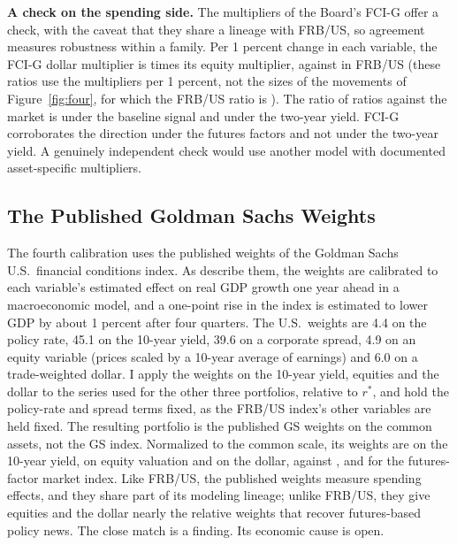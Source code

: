 \documentclass[11pt]{article}
\begin{document}
\textbf{A check on the spending side.} The multipliers of the Board's FCI-G offer a check, with the caveat that they share a lineage with FRB/US, so agreement measures robustness within a family. Per 1 percent change in each variable, the FCI-G dollar multiplier is  times its equity multiplier, against  in FRB/US (these ratios use the multipliers per 1 percent, not the sizes of the movements of Figure~\ref{fig:four}, for which the FRB/US ratio is ). The ratio of ratios against the market is  under the baseline signal and  under the two-year yield. FCI-G corroborates the direction under the futures factors and not under the two-year yield. A genuinely independent check would use another model with documented asset-specific multipliers.

\subsection{The Published Goldman Sachs Weights}\label{sec:gs}
The fourth calibration uses the published weights of the Goldman Sachs U.S.\ financial conditions index. As \citet{caballero2026b} describe them, the weights are calibrated to each variable's estimated effect on real GDP growth one year ahead in a macroeconomic model, and a one-point rise in the index is estimated to lower GDP by about 1 percent after four quarters. The U.S.\ weights are 4.4 on the policy rate, 45.1 on the 10-year yield, 39.6 on a corporate spread, 4.9 on an equity variable (prices scaled by a 10-year average of earnings) and 6.0 on a trade-weighted dollar. I apply the weights on the 10-year yield, equities and the dollar to the series used for the other three portfolios, relative to $r^*$, and hold the policy-rate and spread terms fixed, as the FRB/US index's other variables are held fixed. The resulting portfolio is the published GS weights on the common assets, not the GS index. Normalized to the common scale, its weights are  on the 10-year yield,  on equity valuation and  on the dollar, against ,  and  for the futures-factor market index. Like FRB/US, the published weights measure spending effects, and they share part of its modeling lineage; unlike FRB/US, they give equities and the dollar nearly the relative weights that recover futures-based policy news. The close match is a finding. Its economic cause is open.
\end{document}

